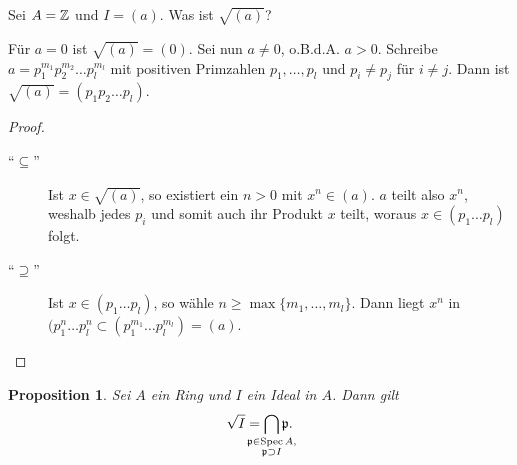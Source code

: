 \documentclass[12pt,a4paper]{scrartcl}
\theoremstyle{cplain}
\newtheorem{prop}[thmcounter]{Proposition}
\theoremstyle{cdef}
\begin{document}
\begin{bsp}
    Sei $A=\mathbb Z$ und $I=(a)$. Was ist $\sqrt{(a)}$?

    Für $a=0$ ist $\sqrt{(a)}=(0)$. Sei nun $a\neq 0$, o.B.d.A. $a>0$. Schreibe $a=p_1^{m_1}p_2^{m_2}\ldots p_l^{m_l}$ mit positiven Primzahlen $p_1, \ldots, p_l$ und $p_i\neq p_j$ für $i\neq j$. Dann ist $\sqrt{(a)}=(p_1p_2\ldots p_l)$.

    \begin{proof}
        \leavevmode
        \begin{description}
            \item[\enquote{$\subseteq$}] Ist $x\in \sqrt{(a)}$, so existiert ein $n>0$ mit $x^n \in (a)$. $a$ teilt also $x^n$, weshalb jedes $p_i$ und somit auch ihr Produkt $x$ teilt, woraus $x \in (p_1\ldots p_l)$ folgt.
            \item[\enquote{$\supseteq$}] Ist $x \in (p_1\ldots p_l)$, so wähle $n \ge \max\{m_1,\ldots,m_l\}$. Dann liegt $x^n$ in $(p_1^n\ldots p_l^n \subset (p_1^{m_1}\ldots p_l^{m_l}) = (a)$.
            \qedhere
        \end{description}
    \end{proof}
\end{bsp}
\begin{prop}
    Sei $A$ ein Ring und $I$ ein Ideal in $A$. Dann gilt
    \[\sqrt{I} = \bigcap_{\mathclap{\substack{\fp\in \Spec A,\\ \fp\supset I}}} \fp.\]
\end{prop}
\end{document}
